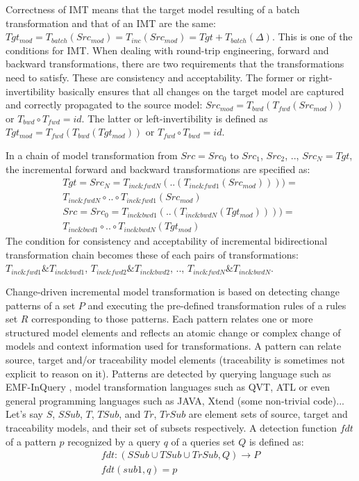 Correctness of IMT means that the target model resulting of a batch transformation and that of an IMT are the same: $Tgt_{mod} = T_{batch} (Src_{mod}) = T_{inc} (Src_{mod}) = Tgt + T_{batch} (\Delta)$. This is one of the conditions for IMT. When dealing with round-trip engineering, forward and backward transformations, there are two requirements that the transformations need to satisfy. These are consistency and acceptability. The former or right-invertibility basically ensures that all changes on the target model are captured and correctly propagated to the source model: $Src_{mod} = T_{bwd} (T_{fwd}(Src_{mod}))$ or $T_{bwd} \circ T_{fwd} = id$. The latter or left-invertibility is defined as $Tgt_{mod} = T_{fwd}(T_{bwd}(Tgt_{mod}))$ or $T_{fwd} \circ T_{bwd} = id$.

In a chain of model transformation from $Src = Src_0$ to $Src_1$,  $Src_2$, ..,  $Src_N = Tgt$, the incremental forward and backward transformations are specified as: 
\begin{align*}
Tgt = Src_N = T_{inc\&fwdN} (..(T_{inc\&fwd1}(Src_{mod})))) = \\ T_{inc\&fwdN} \circ .. \circ T_{inc\&fwd1} (Src_{mod}) \\
Src = Src_0 = T_{inc\&bwd1} (..(T_{inc\&bwdN}(Tgt_{mod})))) = \\ T_{inc\&bwd1} \circ .. \circ T_{inc\&bwdN} (Tgt_{mod})
\end{align*}
The condition for consistency and acceptability of incremental bidirectional transformation chain becomes these of each pairs of transformations: $T_{inc\&fwd1} \& T_{inc\&bwd1}$, $T_{inc\&fwd2} \& T_{inc\&bwd2}$, .., $T_{inc\&fwdN} \& T_{inc\&bwdN}$.


Change-driven incremental model transformation is based on detecting change patterns of a set $P$ and executing the pre-defined transformation rules of a rules set $R$ corresponding to those patterns. Each pattern relates one or more structured model elements and reflects an atomic change or complex change of models and context information used for transformations. A pattern can relate source, target and/or traceability model elements (traceability is sometimes not explicit to reason on it). Patterns are detected by querying language such as EMF-InQuery \cite{Ujhelyi2015}, model transformation languages such as QVT, ATL or even general programming languages such as JAVA, Xtend (some non-trivial code)... Let's say $S$, $SSub$, $T$, $TSub$, and $Tr$, $TrSub$ are element sets of source, target and traceability models, and their set of subsets respectively. A detection function $fdt$ of a pattern $p$ recognized by a query $q$ of a queries set $Q$ is defined as:
\begin{align*}
fdt: ({SSub \cup TSub \cup TrSub},{Q}) \rightarrow P \\
fdt(sub1,q) = p
\end{align*}


